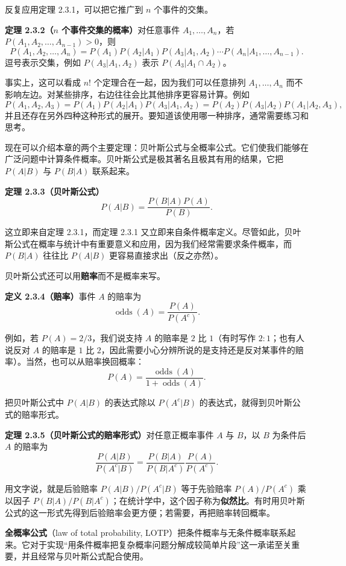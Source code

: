\documentclass[UTF8, 12pt, fontset=fandol, oneside]{ctexart}
\begin{document}
反复应用定理 2.3.1，可以把它推广到 $n$ 个事件的交集。

\noindent\textbf{定理 2.3.2（$n$ 个事件交集的概率）}\quad 对任意事件 $A_1,\ldots,A_n$，若 $P(A_1,A_2,\ldots,A_{n-1})>0$，则
\[
  P(A_1,A_2,\ldots,A_n)
  =
  P(A_1)P(A_2|A_1)P(A_3|A_1,A_2)\cdots
  P(A_n|A_1,\ldots,A_{n-1}).
\]
逗号表示交集，例如 $P(A_3|A_1,A_2)$ 表示 $P(A_3|A_1\cap A_2)$。

事实上，这可以看成 $n!$ 个定理合在一起，因为我们可以任意排列 $A_1,\ldots,A_n$ 而不影响左边。对某些排序，右边往往会比其他排序更容易计算。例如
\[
  P(A_1,A_2,A_3)
  =
  P(A_1)P(A_2|A_1)P(A_3|A_1,A_2)
  =
  P(A_2)P(A_3|A_2)P(A_1|A_2,A_3),
\]
并且还存在另外四种这种形式的展开。要知道该使用哪一种排序，通常需要练习和思考。

现在可以介绍本章的两个主要定理：贝叶斯公式与全概率公式。它们使我们能够在广泛问题中计算条件概率。贝叶斯公式是极其著名且极其有用的结果，它把 $P(A|B)$ 与 $P(B|A)$ 联系起来。

\noindent\textbf{定理 2.3.3（贝叶斯公式）}\quad
\[
  P(A|B)=\frac{P(B|A)P(A)}{P(B)}.
\]

这立即来自定理 2.3.1，而定理 2.3.1 又立即来自条件概率定义。尽管如此，贝叶斯公式在概率与统计中有重要意义和应用，因为我们经常需要求条件概率，而 $P(B|A)$ 往往比 $P(A|B)$ 更容易直接求出（反之亦然）。

贝叶斯公式还可以用\textbf{赔率}而不是概率来写。

\noindent\textbf{定义 2.3.4（赔率）}\quad 事件 $A$ 的赔率为
\[
  \operatorname{odds}(A)=\frac{P(A)}{P(A^c)}.
\]

例如，若 $P(A)=2/3$，我们说支持 $A$ 的赔率是 $2$ 比 $1$（有时写作 $2:1$；也有人说反对 $A$ 的赔率是 $1$ 比 $2$，因此需要小心分辨所说的是支持还是反对某事件的赔率）。当然，也可以从赔率换回概率：
\[
  P(A)=\frac{\operatorname{odds}(A)}{1+\operatorname{odds}(A)}.
\]

把贝叶斯公式中 $P(A|B)$ 的表达式除以 $P(A^c|B)$ 的表达式，就得到贝叶斯公式的赔率形式。

\noindent\textbf{定理 2.3.5（贝叶斯公式的赔率形式）}\quad 对任意正概率事件 $A$ 与 $B$，以 $B$ 为条件后 $A$ 的赔率为
\[
  \frac{P(A|B)}{P(A^c|B)}
  =
  \frac{P(B|A)}{P(B|A^c)}
  \frac{P(A)}{P(A^c)}.
\]

用文字说，就是后验赔率 $P(A|B)/P(A^c|B)$ 等于先验赔率 $P(A)/P(A^c)$ 乘以因子 $P(B|A)/P(B|A^c)$；在统计学中，这个因子称为\textbf{似然比}。有时用贝叶斯公式的这一形式先得到后验赔率会更方便；若需要，再把赔率转回概率。

\textbf{全概率公式}（law of total probability, LOTP）把条件概率与无条件概率联系起来。它对于实现“用条件概率把复杂概率问题分解成较简单片段”这一承诺至关重要，并且经常与贝叶斯公式配合使用。
\end{document}
